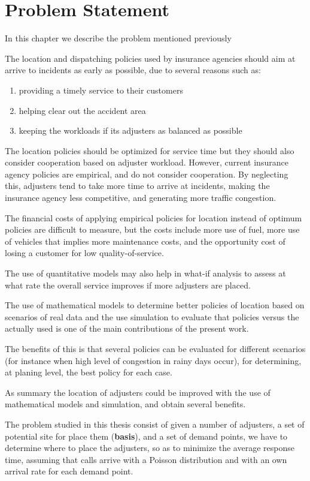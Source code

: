 \section{Problem Statement}
In this chapter we describe the problem
mentioned previously

The location and dispatching policies
used by insurance agencies
should aim
at arrive to incidents
as early as possible,
due to several reasons
such as:
\begin{enumerate}
\item providing a timely service to their customers
\item helping clear out the accident area
\item keeping the workloads if its adjusters
  as balanced as possible
\end{enumerate}
The location policies
should be optimized for service time
but they should also consider
cooperation based on adjuster workload.
However,
current insurance agency policies
are empirical,
and do not consider cooperation.
By neglecting this,
adjusters tend to take
more time to arrive at incidents,
making the insurance agency
less competitive,
and generating more traffic congestion.

The financial costs
of applying
empirical policies for location
instead of optimum policies
are difficult to measure,
but the costs include
more use of fuel,
more use of vehicles
that implies
more maintenance costs,
and the opportunity cost
of losing a customer
for low quality-of-service.

The use of quantitative models
may also help
in what-if analysis
to assess at what rate
the overall service
improves if more adjusters are placed.

The use of mathematical models
to determine better policies of location
based on scenarios
of real data
and the use simulation
to evaluate that policies
versus the actually used
is one of the main contributions
of the present work.

The benefits of this
is that several policies
can be evaluated
for different scenarios
(for instance
when high level of congestion
in rainy days occur),
for determining,
at planing level,
the best policy
for each case.

As summary
the location of adjusters
could be improved
with the use of
mathematical models and simulation,
and obtain several benefits.

The problem studied in this thesis
consist of
given a number of adjusters,
a set of potential site for place them (\textbf{basis}),
and a set of demand points,
we have to determine
where to place the adjusters,
so as to minimize 
the average response time,
assuming
that calls
arrive with a Poisson distribution
and with an own arrival rate
for each demand point.
